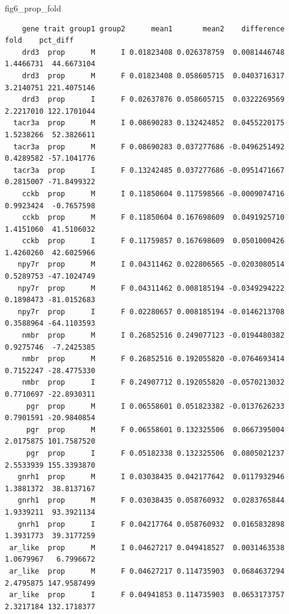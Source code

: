 \documentclass[
  landscape]{article}
\newenvironment{Shaded}{\begin{snugshade}}{\end{snugshade}}
\newcommand{\NormalTok}[1]{#1}
\begin{document}
\begin{Shaded}
\begin{Highlighting}[]
\NormalTok{fig6\_prop\_fold}
\end{Highlighting}
\end{Shaded}

\begin{verbatim}
    gene trait group1 group2      mean1       mean2    difference      fold    pct_diff
    drd3  prop      M      I 0.01823408 0.026378759  0.0081446748 1.4466731  44.6673104
    drd3  prop      M      F 0.01823408 0.058605715  0.0403716317 3.2140751 221.4075146
    drd3  prop      I      F 0.02637876 0.058605715  0.0322269569 2.2217010 122.1701044
  tacr3a  prop      M      I 0.08690283 0.132424852  0.0455220175 1.5238266  52.3826611
  tacr3a  prop      M      F 0.08690283 0.037277686 -0.0496251492 0.4289582 -57.1041776
  tacr3a  prop      I      F 0.13242485 0.037277686 -0.0951471667 0.2815007 -71.8499322
    cckb  prop      M      I 0.11850604 0.117598566 -0.0009074716 0.9923424  -0.7657598
    cckb  prop      M      F 0.11850604 0.167698609  0.0491925710 1.4151060  41.5106032
    cckb  prop      I      F 0.11759857 0.167698609  0.0501000426 1.4260260  42.6025966
   npy7r  prop      M      I 0.04311462 0.022806565 -0.0203080514 0.5289753 -47.1024749
   npy7r  prop      M      F 0.04311462 0.008185194 -0.0349294222 0.1898473 -81.0152683
   npy7r  prop      I      F 0.02280657 0.008185194 -0.0146213708 0.3588964 -64.1103593
    nmbr  prop      M      I 0.26852516 0.249077123 -0.0194480382 0.9275746  -7.2425385
    nmbr  prop      M      F 0.26852516 0.192055820 -0.0764693414 0.7152247 -28.4775330
    nmbr  prop      I      F 0.24907712 0.192055820 -0.0570213032 0.7710697 -22.8930311
     pgr  prop      M      I 0.06558601 0.051823382 -0.0137626233 0.7901591 -20.9840854
     pgr  prop      M      F 0.06558601 0.132325506  0.0667395004 2.0175875 101.7587520
     pgr  prop      I      F 0.05182338 0.132325506  0.0805021237 2.5533939 155.3393870
   gnrh1  prop      M      I 0.03038435 0.042177642  0.0117932946 1.3881372  38.8137167
   gnrh1  prop      M      F 0.03038435 0.058760932  0.0283765844 1.9339211  93.3921134
   gnrh1  prop      I      F 0.04217764 0.058760932  0.0165832898 1.3931773  39.3177259
 ar_like  prop      M      I 0.04627217 0.049418527  0.0031463538 1.0679967   6.7996672
 ar_like  prop      M      F 0.04627217 0.114735903  0.0684637294 2.4795875 147.9587499
 ar_like  prop      I      F 0.04941853 0.114735903  0.0653173757 2.3217184 132.1718377
\end{verbatim}
\end{document}
